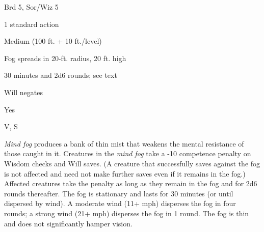 
\begin{description*}
\item[Level:] Brd 5, Sor/Wiz 5
\item[Casting Time:] 1 standard action
\item[Range:] Medium (100 ft. + 10 ft./level)
\item[Effect:] Fog spreads in 20-ft. radius, 20 ft. high
\item[Duration:] 30 minutes and 2d6 rounds; see text
\item[Saving Throw:] Will negates
\item[Spell Resistance:] Yes
\item[Components:] V, S
\end{description*}

\textit{Mind fog} produces a bank of thin mist that weakens the mental resistance
of those caught in it. Creatures in the \textit{mind fog} take a -10 competence
penalty on Wisdom checks and Will saves. (A creature that successfully saves against
the fog is not affected and need not make further saves even if it remains in the
fog.) Affected creatures take the penalty as long as they remain in the fog and
for 2d6 rounds thereafter. The fog is stationary and lasts for 30 minutes (or until
dispersed by wind).
A moderate wind (11+ mph) disperses the fog in four rounds; a strong wind (21+
mph) disperses the fog in 1 round.
The fog is thin and does not significantly hamper vision.